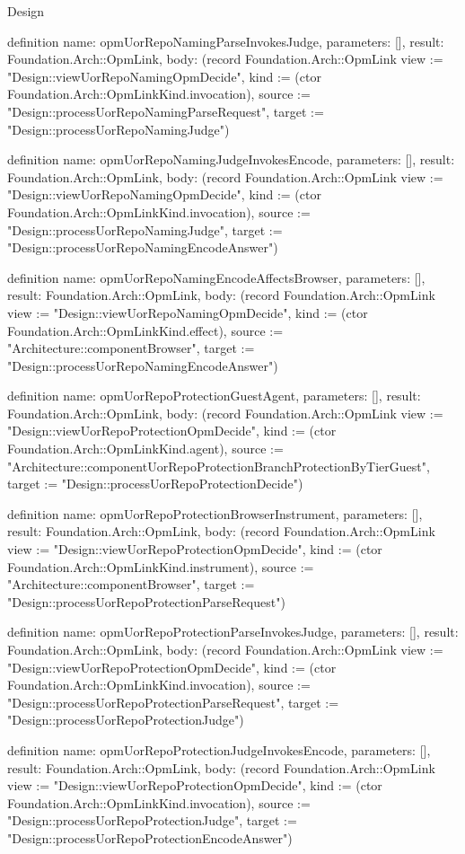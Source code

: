 \begin{lexlean}{Design}
\begin{semanticmodule}
definition{
  name: opmUorRepoNamingParseInvokesJudge,
  parameters: [],
  result: Foundation.Arch::OpmLink,
  body: (record Foundation.Arch::OpmLink {view := "Design::viewUorRepoNamingOpmDecide", kind := (ctor Foundation.Arch::OpmLinkKind.invocation), source := "Design::processUorRepoNamingParseRequest", target := "Design::processUorRepoNamingJudge"})
}

definition{
  name: opmUorRepoNamingJudgeInvokesEncode,
  parameters: [],
  result: Foundation.Arch::OpmLink,
  body: (record Foundation.Arch::OpmLink {view := "Design::viewUorRepoNamingOpmDecide", kind := (ctor Foundation.Arch::OpmLinkKind.invocation), source := "Design::processUorRepoNamingJudge", target := "Design::processUorRepoNamingEncodeAnswer"})
}

definition{
  name: opmUorRepoNamingEncodeAffectsBrowser,
  parameters: [],
  result: Foundation.Arch::OpmLink,
  body: (record Foundation.Arch::OpmLink {view := "Design::viewUorRepoNamingOpmDecide", kind := (ctor Foundation.Arch::OpmLinkKind.effect), source := "Architecture::componentBrowser", target := "Design::processUorRepoNamingEncodeAnswer"})
}

definition{
  name: opmUorRepoProtectionGuestAgent,
  parameters: [],
  result: Foundation.Arch::OpmLink,
  body: (record Foundation.Arch::OpmLink {view := "Design::viewUorRepoProtectionOpmDecide", kind := (ctor Foundation.Arch::OpmLinkKind.agent), source := "Architecture::componentUorRepoProtectionBranchProtectionByTierGuest", target := "Design::processUorRepoProtectionDecide"})
}

definition{
  name: opmUorRepoProtectionBrowserInstrument,
  parameters: [],
  result: Foundation.Arch::OpmLink,
  body: (record Foundation.Arch::OpmLink {view := "Design::viewUorRepoProtectionOpmDecide", kind := (ctor Foundation.Arch::OpmLinkKind.instrument), source := "Architecture::componentBrowser", target := "Design::processUorRepoProtectionParseRequest"})
}

definition{
  name: opmUorRepoProtectionParseInvokesJudge,
  parameters: [],
  result: Foundation.Arch::OpmLink,
  body: (record Foundation.Arch::OpmLink {view := "Design::viewUorRepoProtectionOpmDecide", kind := (ctor Foundation.Arch::OpmLinkKind.invocation), source := "Design::processUorRepoProtectionParseRequest", target := "Design::processUorRepoProtectionJudge"})
}

definition{
  name: opmUorRepoProtectionJudgeInvokesEncode,
  parameters: [],
  result: Foundation.Arch::OpmLink,
  body: (record Foundation.Arch::OpmLink {view := "Design::viewUorRepoProtectionOpmDecide", kind := (ctor Foundation.Arch::OpmLinkKind.invocation), source := "Design::processUorRepoProtectionJudge", target := "Design::processUorRepoProtectionEncodeAnswer"})
}


\end{semanticmodule}
\end{lexlean}
